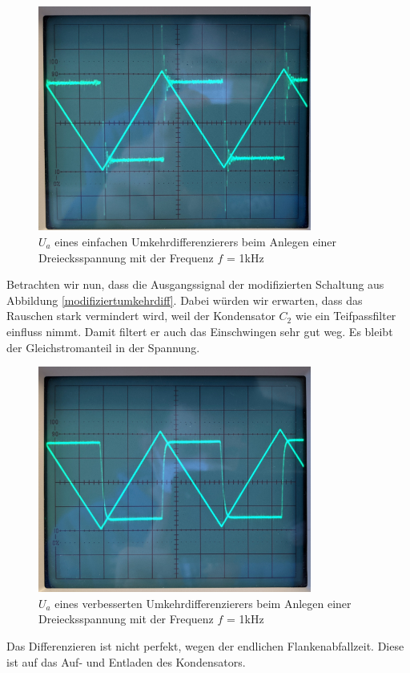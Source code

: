 \begin{figure}[h]
    \centering
    \includegraphics[width = 9cm]{Bilder/43-diffSchwingung.jpg}
    \caption{$U_a$ eines einfachen Umkehrdifferenzierers beim Anlegen einer Dreiecksspannung mit der Frequenz $f$ = 1kHz}
    \label{Einschwingprozess}
\end{figure}

Betrachten wir nun, dass die Ausgangssignal der modifizierten Schaltung aus Abbildung \ref{modifiziertumkehrdiff}. Dabei würden 
wir erwarten, dass das Rauschen stark vermindert wird, weil der Kondensator $C_2$ wie ein Teifpassfilter einfluss nimmt. Damit filtert er auch 
das Einschwingen sehr gut weg. Es bleibt der Gleichstromanteil in der Spannung.
\begin{figure}[h]
    \centering
    \includegraphics[width = 9cm]{Bilder/43-diffStabil.jpg}
    \caption{$U_a$ eines verbesserten Umkehrdifferenzierers beim Anlegen einer Dreiecksspannung mit der Frequenz $f$ = 1kHz}
    \label{Einschwingprozess}
\end{figure}
Das Differenzieren ist nicht perfekt, wegen der endlichen Flankenabfallzeit. Diese ist auf das Auf- und Entladen des Kondensators.

